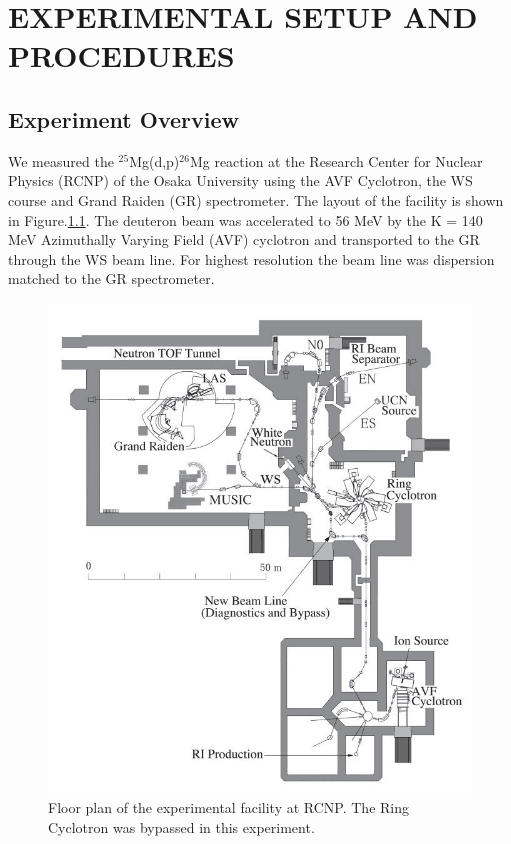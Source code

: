 
\chapter{EXPERIMENTAL SETUP AND PROCEDURES}

\section{Experiment Overview}
We measured the $^{25}$Mg(d,p)$^{26}$Mg reaction  at the Research Center for Nuclear Physics (RCNP) of the Osaka University using the AVF Cyclotron, the WS course and Grand Raiden (GR) spectrometer. The layout of the facility is shown in Figure.\ref{fig:RCNP_layout}. The deuteron beam was accelerated to 56 MeV by the  K = 140 MeV Azimuthally Varying Field (AVF) cyclotron and transported to the  GR through the WS beam line. For highest resolution the beam line was dispersion matched to the GR spectrometer.

\begin{figure}[tpb]
  \begin{center}
    \centerline{\includegraphics[scale=0.6]{graph/ch3/RCNP_layout}}
    \caption{Floor plan of the experimental facility at RCNP. The Ring Cyclotron was bypassed in this experiment.~\citep{Hatanaka2013}
    }
    \label{fig:RCNP_layout}
  \end{center}
\end{figure}

